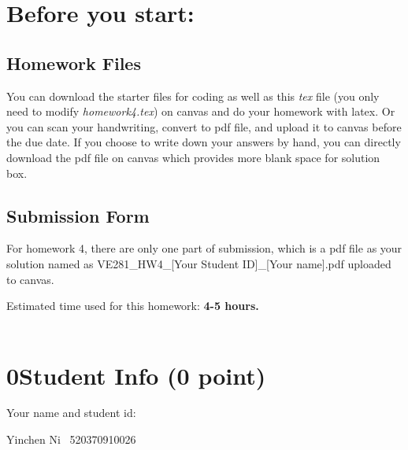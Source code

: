 \documentclass[11pt]{exam}
\newcommand{\hwnum}{4}
\begin{document}
\setlength{\parindent}{0pt}
\section*{Before you start:}

\subsection*{Homework Files}
You can download the starter files for coding as well as this \textit{tex} file (you only need to modify \textit{homework\hwnum.tex}) on canvas and do your homework with latex. Or you can scan your handwriting, convert to pdf file, and upload it to canvas before the due date. If you choose to write down your answers by hand, you can directly download the pdf file on canvas which provides more blank space for solution box.

\subsection*{Submission Form}
For homework \hwnum, there are only one part of submission, which is a pdf file as your solution named as VE281\_HW\hwnum\_[Your Student ID]\_[Your name].pdf uploaded to canvas.

Estimated time used for this homework: \textbf{4-5 hours.}
\\\\


\newpage
\section*{0\quad Student Info (0 point)}
Your name and student id:
\begin{solution}
Yinchen Ni~ 520370910026
\end{solution}
\end{document}
